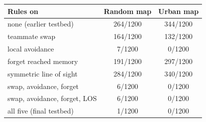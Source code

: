 \begin{tabular}{lcc}
\toprule
Rules on & Random map & Urban map \\
\midrule
none (earlier testbed) & 264/1200 & 344/1200 \\
teammate swap & 164/1200 & 132/1200 \\
local avoidance & 7/1200 & 0/1200 \\
forget reached memory & 191/1200 & 297/1200 \\
symmetric line of sight & 284/1200 & 340/1200 \\
swap, avoidance, forget & 6/1200 & 0/1200 \\
swap, avoidance, forget, LOS & 6/1200 & 0/1200 \\
all five (final testbed) & 1/1200 & 0/1200 \\
\bottomrule
\end{tabular}
